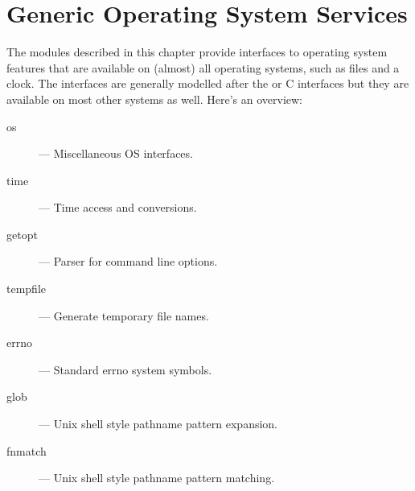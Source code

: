 \chapter{Generic Operating System Services}

The modules described in this chapter provide interfaces to operating
system features that are available on (almost) all operating systems,
such as files and a clock.  The interfaces are generally modelled
after the \UNIX{} or C interfaces but they are available on most other
systems as well.  Here's an overview:

\begin{description}

\item[os]
--- Miscellaneous OS interfaces.

\item[time]
--- Time access and conversions.

\item[getopt]
--- Parser for command line options.

\item[tempfile]
--- Generate temporary file names.

\item[errno]
--- Standard errno system symbols.

\item[glob]
--- Unix shell style pathname pattern expansion.

\item[fnmatch]
--- Unix shell style pathname pattern matching.

\end{description}
